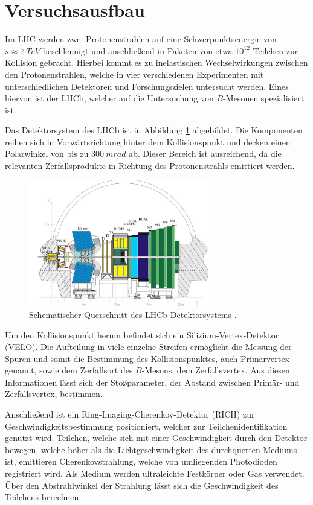 \section{Versuchsausfbau}
Im LHC werden zwei Protonenstrahlen auf eine Schwerpunktsenergie von $s \approx \SI{7}{TeV}$ beschleunigt und anschließend in Paketen von etwa $10^{12}$ Teilchen zur Kollision gebracht. Hierbei kommt es zu inelastischen Wechselwirkungen zwischen den Protonenstrahlen, welche in vier verschiedenen Experimenten mit unterschiedlichen Detektoren und Forschungszielen untersucht werden. Eines hiervon ist der LHCb, welcher auf die Untersuchung von $B$-Mesonen spezialisiert ist.

Das Detektorsystem des LHCb ist in Abbildung \ref{fig:Aufbau} abgebildet. Die Komponenten reihen sich in Vorwärtsrichtung hinter dem Kollisionspunkt und decken einen Polarwinkel von bis zu $\SI{300}{mrad}$ ab. Dieser Bereich ist ausreichend, da die relevanten Zerfallsprodukte in Richtung des Protonenstrahls emittiert werden.

\begin{figure}
    \centering
    \includegraphics[width=0.7\textwidth]{plots/LHCb_Schnitt.jpg}
    \caption{Schematischer Querschnitt des LHCb Detektorsystems \cite{wiki}.}
    \label{fig:Aufbau}
\end{figure}

Um den Kollisionspunkt herum befindet sich ein Silizium-Vertex-Detektor (VELO). Die Aufteilung in viele einzelne Streifen ermöglicht die Messung der Spuren und somit die Bestimmung des Kollisionspunktes, auch Primärvertex genannt, sowie dem Zerfallsort des $B$-Mesons, dem Zerfallsvertex. Aus diesen Informationen lässt sich der Stoßparameter, der Abstand zwischen Primär- und Zerfallsvertex, bestimmen.

Anschließend ist ein Ring-Imaging-Cherenkov-Detektor (RICH) zur Geschwindigkeitsbestimmung positioniert, welcher zur Teilchenidentifikation genutzt wird. Teilchen, welche sich mit einer Geschwindigkeit durch den Detektor bewegen, welche höher als die Lichtgeschwindigkeit des durchquerten Mediums ist, emittieren Cherenkovstrahlung, welche von umliegenden Photodioden registriert wird. Als Medium werden ultraleichte Festkörper oder Gas verwendet. Über den Abstrahlwinkel der Strahlung lässt sich die Geschwindigkeit des Teilchens berechnen.

